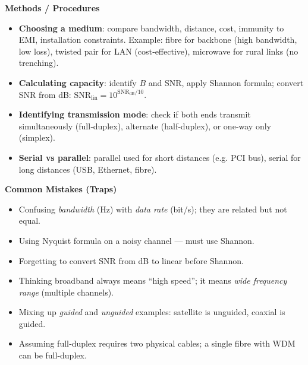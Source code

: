 \documentclass[11pt]{article}
\begin{document}
\begin{bilan}
\textbf{Methods / Procedures}
\begin{itemize}
  \item \textbf{Choosing a medium}: compare bandwidth, distance, cost, immunity to EMI, installation constraints. Example: fibre for backbone (high bandwidth, low loss), twisted pair for LAN (cost‑effective), microwave for rural links (no trenching).
  \item \textbf{Calculating capacity}: identify $B$ and SNR, apply Shannon formula; convert SNR from dB: $\mathrm{SNR}_{\text{lin}} = 10^{\mathrm{SNR}_{\text{dB}}/10}$.
  \item \textbf{Identifying transmission mode}: check if both ends transmit simultaneously (full‑duplex), alternate (half‑duplex), or one‑way only (simplex).
  \item \textbf{Serial vs parallel}: parallel used for short distances (e.g. PCI bus), serial for long distances (USB, Ethernet, fibre).
\end{itemize}

\textbf{Common Mistakes (Traps)}
\begin{itemize}
  \item Confusing \emph{bandwidth} (Hz) with \emph{data rate} (bit/s); they are related but not equal.
  \item Using Nyquist formula on a noisy channel — must use Shannon.
  \item Forgetting to convert SNR from dB to linear before Shannon.
  \item Thinking broadband always means “high speed”; it means \emph{wide frequency range} (multiple channels).
  \item Mixing up \emph{guided} and \emph{unguided} examples: satellite is unguided, coaxial is guided.
  \item Assuming full‑duplex requires two physical cables; a single fibre with WDM can be full‑duplex.
\end{itemize}


\end{bilan}
\end{document}
